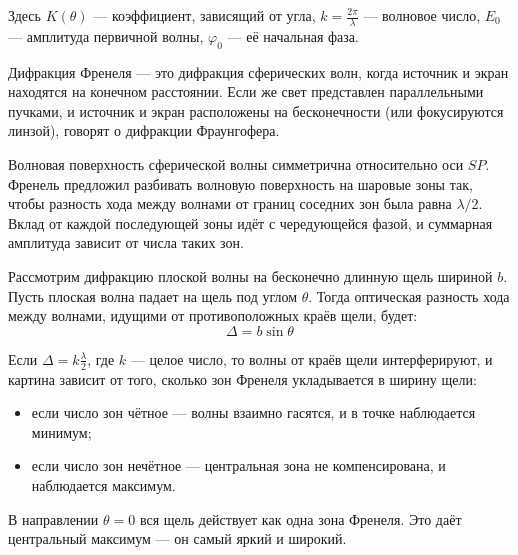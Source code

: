 Здесь $K(\theta)$ — коэффициент, зависящий от угла, $k = \frac{2\pi}{\lambda}$ — волновое число, $E_0$ — амплитуда первичной волны, $\varphi_0$ — её начальная фаза.

Дифракция Френеля — это дифракция сферических волн, когда источник и экран находятся на конечном расстоянии. Если же свет представлен параллельными пучками, и источник и экран расположены на бесконечности (или фокусируются линзой), говорят о дифракции Фраунгофера.

Волновая поверхность сферической волны симметрична относительно оси $SP$. Френель предложил разбивать волновую поверхность на шаровые зоны так, чтобы разность хода между волнами от границ соседних зон была равна $\lambda/2$. Вклад от каждой последующей зоны идёт с чередующейся фазой, и суммарная амплитуда зависит от числа таких зон.

Рассмотрим дифракцию плоской волны на бесконечно длинную щель шириной $b$. Пусть плоская волна падает на щель под углом $\theta$. Тогда оптическая разность хода между волнами, идущими от противоположных краёв щели, будет:
\[ \Delta = b \sin \theta \]

Если $\Delta = k\frac{\lambda}{2}$, где $k$ — целое число, то волны от краёв щели интерферируют, и картина зависит от того, сколько зон Френеля укладывается в ширину щели:
\begin{itemize}
  \item если число зон чётное — волны взаимно гасятся, и в точке наблюдается минимум;
  \item если число зон нечётное — центральная зона не компенсирована, и наблюдается максимум.
\end{itemize}

В направлении $\theta = 0$ вся щель действует как одна зона Френеля. Это даёт центральный максимум — он самый яркий и широкий.
